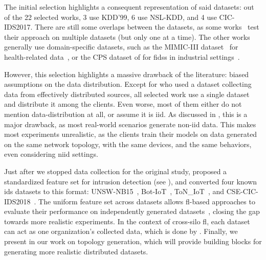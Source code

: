 The initial selection highlights a consequent representation of said datasets: out of the 22 selected works, 3 use KDD'99, 6 use NSL-KDD, and 4 use CIC-IDS2017.
There are still some overlaps between the datasets, as some works~\cite{zhao_MultiTaskNetworkAnomaly_2019,fan_IoTDefenderFederatedTransfer_2020,qin_LineSpeedScalableIntrusion_2020,chen_IntrusionDetectionWireless_2020} test their approach on multiple datasets (but only one at a time).
The other works generally use domain-specific datasets, such as the MIMIC-III dataset~\cite{johnson_MIMICIIIfreelyaccessible_2016} for health-related data~\cite{schneble_Attackdetectionusing_2019}, or the CPS dataset of \textcite{morris_IndustrialControlSystem_2014} for \glspl{fids} in industrial settings~\cite{li_DeepFedFederatedDeep_2020}.

However, this selection highlights a massive drawback of the literature: biased assumptions on the data distribution.
Except for  who used a dataset collecting data from effectively distributed sources, all selected work use a single dataset and distribute it among the clients.
Even worse, most of them either do not mention data-distribution at all, or assume it is \gls{iid}.
As discussed in , this is a major drawback, as most real-world scenarios generate non-\gls{iid} data.
This makes most experiments unrealistic, as the clients train their models on data generated on the same network topology, with the same devices, and the same behaviors, even considering \gls{niid} settings.

Just after we stopped data collection for the original study, \textcite{sarhan_StandardFeatureSet_2022} proposed a standardized feature set for intrusion detection (see ), and converted four known \gls{ids} datasets to this format: UNSW-NB15~\cite{moustafa_UNSWNB15comprehensivedata_2015}, Bot-IoT~\cite{koroniotis_developmentrealisticbotnet_2019}, ToN\_IoT~\cite{moustafa_FederatedTON_IoTWindows_2020}, and CSE-CIC-IDS2018~\cite{sharafaldin_GeneratingNewIntrusion_2018}.
The uniform feature set across datasets allows \gls{fl}-based approaches to evaluate their performance on independently generated datasets~\cite{popoola_FederatedDeepLearning_2021,decarvalhobertoli_Generalizingintrusiondetection_2023}, closing the gap towards more realistic experiments.
In the context of cross-silo \gls{fl}, each dataset can act as one organization's collected data, which is done by  \textcite{decarvalhobertoli_Generalizingintrusiondetection_2023}.
Finally, we present in  our work on topology generation, which will provide building blocks for generating more realistic distributed datasets.


